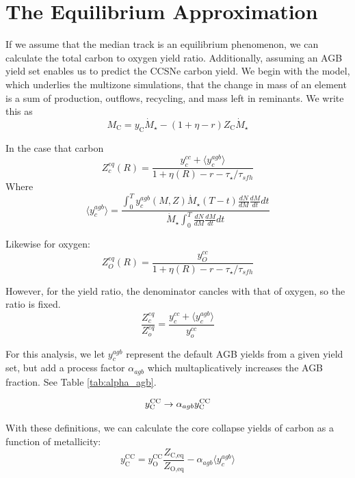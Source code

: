 \documentclass[fleqn,usenatbib]{mnras}
\begin{document}
\section{The Equilibrium Approximation}\label{sec:equilibrium}
If we assume that the median track is an equilibrium phenomenon, we can calculate the total carbon to oxygen yield ratio. Additionally, assuming an AGB yield set enables us to predict the CCSNe carbon yield.  
We begin with the model, which underlies the multizone simulations, that the change in mass of an element is a sum of production, outflows, recycling, and mass left in reminants. We write this as
\begin{equation}
M_\text{C} = y_\text{C} \dot{M}_\star - (1 + \eta - r) Z_\text{C} \dot{M}_\star
\end{equation}

In the case that carbon
\begin{equation}
Z_c^{eq}(R) = \frac{y_c^{cc} + \langle y_c^{agb} \rangle }{1 + \eta(R) - r - \tau_\star / \tau_{sfh}}
\end{equation}Where
\begin{equation}
\langle y_c^{agb} \rangle = \frac{\int_0^T y_c^{agb}(M, Z) \dot{M}_\star(T - t) \frac{dN}{dM} \frac{dM}{dt} dt  }{ \dot{M}_\star \int_0^T \frac{dN}{dM} \frac{dM}{dt} dt}
\end{equation}

Likewise for oxygen:
\begin{equation}
Z_O^{eq}(R) = \frac{y_O^{cc}}{1 + \eta(R) - r - \tau_\star / \tau_{sfh}}
\end{equation}

However, for the yield ratio, the denominator cancles with that of oxygen, so the ratio is fixed.
\begin{equation}
\frac{Z_c^{eq}}{Z_o^{eq}} = \frac{y_c^{cc} + \langle y_c^{agb} \rangle }{y_o^{cc}}
\end{equation}

For this analysis, we let $y_c^{agb}$ represent the default AGB yields from a given yield set, but add a process factor $\alpha_{agb}$ which multaplicatively increases the AGB fraction. See Table \ref{tab:alpha_agb}.

\begin{equation}
    y_{\rm C}^{\rm CC} \rightarrow \alpha_{agb}  y_{\rm C}^{\rm CC}
\end{equation}

With these definitions, we can calculate the core collapse yields of carbon as a function of metallicity:
\begin{equation}
    y_\text{C}^\text{CC} =  y_\text{O}^\text{CC} \frac{Z_\text{C,eq}}{Z_\text{O,eq}} - \alpha_{agb} \langle y_c^{agb} \rangle
\end{equation}
\end{document}
